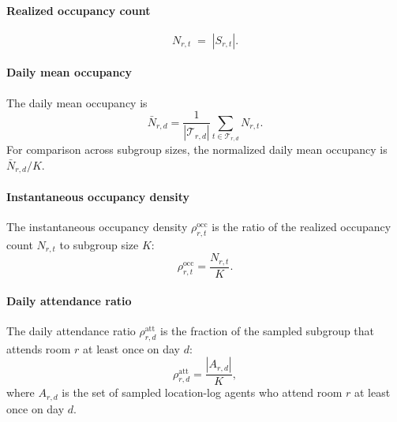 \paragraph{Realized occupancy count}
\begin{equation}
N_{r,t} \;=\; |S_{r,t}|.
\label{eq:Nt}
\end{equation}

\paragraph{Daily mean occupancy}
The daily mean occupancy is
\begin{equation}
\bar{N}_{r,d}
=
\frac{1}{|\mathcal{T}_{r,d}|}
\sum_{t\in\mathcal{T}_{r,d}} N_{r,t}.
\label{eq:mean_occ_daily}
\end{equation}
For comparison across subgroup sizes, the normalized daily mean occupancy is $\bar{N}_{r,d}/K$.

\paragraph{Instantaneous occupancy density}
The instantaneous occupancy density $\rho_{r,t}^{\mathrm{occ}}$ is the ratio of the realized occupancy count $N_{r,t}$ to subgroup size $K$:
\begin{equation}
\rho_{r,t}^{\mathrm{occ}}=\frac{N_{r,t}}{K}.
\label{eq:instantaneous_occupancy_density}
\end{equation}

\paragraph{Daily attendance ratio}
The daily attendance ratio $\rho_{r,d}^{\mathrm{att}}$ is the fraction of the sampled subgroup that attends room $r$ at least once on day $d$:
\begin{equation}
\rho_{r,d}^{\mathrm{att}}=\frac{|A_{r,d}|}{K},
\label{eq:occupancy_and_attendance_ratios}
\end{equation}
where $A_{r,d}$ is the set of sampled location-log agents who attend room $r$ at least once on day $d$.

